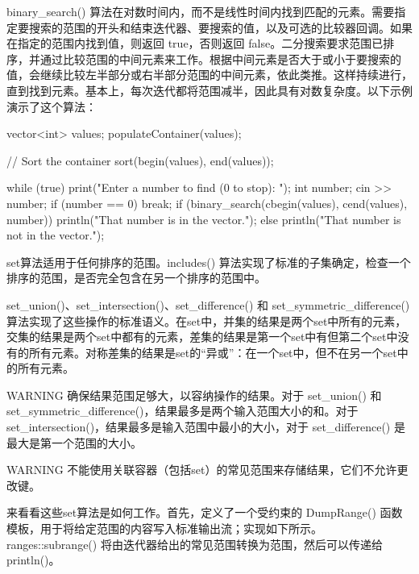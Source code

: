 binary\_search() 算法在对数时间内，而不是线性时间内找到匹配的元素。需要指定要搜索的范围的开头和结束迭代器、要搜索的值，以及可选的比较器回调。如果在指定的范围内找到值，则返回 true，否则返回 false。二分搜索要求范围已排序，并通过比较范围的中间元素来工作。根据中间元素是否大于或小于要搜索的值，会继续比较左半部分或右半部分范围的中间元素，依此类推。这样持续进行，直到找到元素。基本上，每次迭代都将范围减半，因此具有对数复杂度。以下示例演示了这个算法：

\begin{cpp}
vector<int> values;
populateContainer(values);

// Sort the container
sort(begin(values), end(values));

while (true) {
    print("Enter a number to find (0 to stop): ");
    int number;
    cin >> number;
    if (number == 0) { break; }
    if (binary_search(cbegin(values), cend(values), number)) {
        println("That number is in the vector.");
    } else {
        println("That number is not in the vector.");
    }
}
\end{cpp}


set算法适用于任何排序的范围。includes() 算法实现了标准的子集确定，检查一个排序的范围，是否完全包含在另一个排序的范围中。

set\_union()、set\_intersection()、set\_difference() 和 set\_symmetric\_difference() 算法实现了这些操作的标准语义。在set中，并集的结果是两个set中所有的元素，交集的结果是两个set中都有的元素，差集的结果是第一个set中有但第二个set中没有的所有元素。对称差集的结果是set的“异或”：在一个set中，但不在另一个set中的所有元素。

\begin{myWarning}{WARNING}
确保结果范围足够大，以容纳操作的结果。对于 set\_union() 和 set\_symmetric\_difference()，结果最多是两个输入范围大小的和。对于 set\_intersection()，结果最多是输入范围中最小的大小，对于 set\_difference() 是最大是第一个范围的大小。
\end{myWarning}

\begin{myWarning}{WARNING}
不能使用关联容器（包括set）的常见范围来存储结果，它们不允许更改键。
\end{myWarning}

来看看这些set算法是如何工作。首先，定义了一个受约束的 DumpRange() 函数模板，用于将给定范围的内容写入标准输出流；实现如下所示。ranges::subrange() 将由迭代器给出的常见范围转换为范围，然后可以传递给 println()。


